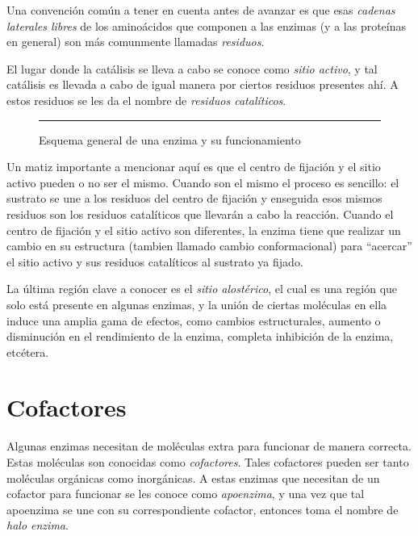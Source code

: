 Una convención común a tener en cuenta antes de avanzar es que esas \emph{cadenas laterales libres} de los aminoácidos que componen a las enzimas (y a las proteínas en general) son más comunmente llamadas \emph{residuos}.

El lugar donde la catálisis se lleva a cabo se conoce como \emph{sitio activo}, y tal catálisis es llevada a cabo de igual manera por ciertos residuos presentes ahí. A estos residuos se les da el nombre de \emph{residuos catalíticos}.

\begin{figure}\centering
    \resizebox{\linewidth}{!}{}
    \rule{\linewidth}{0.5pt}
    \caption{Esquema general de una enzima y su funcionamiento}
    \label{fig:esquema_de_una_enzima}
\end{figure}

Un matiz importante a mencionar aquí es que el centro de fijación y el sitio activo pueden o no ser el mismo. Cuando son el mismo el proceso es sencillo: el sustrato se une a los residuos del centro de fijación y enseguida esos mismos residuos son los residuos catalíticos que llevarán a cabo la reacción. Cuando el centro de fijación y el sitio activo son diferentes, la enzima tiene que realizar un cambio en su estructura (tambien llamado cambio conformacional) para ``acercar'' el sitio activo y sus residuos catalíticos al sustrato ya fijado.

La última región clave a conocer es el \emph{sitio alostérico}, el cual es una región que solo está presente en algunas enzimas, y la unión de ciertas moléculas en ella induce una amplia gama de efectos, como cambios estructurales, aumento o disminución en el rendimiento de la enzima, completa inhibición de la enzima, etcétera.

\section{Cofactores}

Algunas enzimas necesitan de moléculas extra para funcionar de manera correcta. Estas moléculas son conocidas como \emph{cofactores}. Tales cofactores pueden ser tanto moléculas orgánicas como inorgánicas. A estas enzimas que necesitan de un cofactor para funcionar se les conoce como \emph{apoenzima}, y una vez que tal apoenzima se une con su correspondiente cofactor, entonces toma el nombre de \emph{halo enzima}.